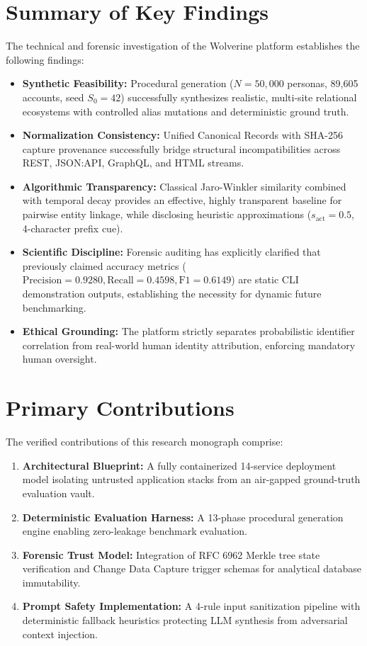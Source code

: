 \section{Summary of Key Findings}
\label{sec:concl-findings}
The technical and forensic investigation of the Wolverine platform establishes the following findings:
\begin{itemize}
    \item \textbf{Synthetic Feasibility:} Procedural generation ($N = 50{,}000$ personas, 89,605 accounts, seed $S_0 = 42$) successfully synthesizes realistic, multi-site relational ecosystems with controlled alias mutations and deterministic ground truth.
    \item \textbf{Normalization Consistency:} Unified Canonical Records with SHA-256 capture provenance successfully bridge structural incompatibilities across REST, JSON:API, GraphQL, and HTML streams.
    \item \textbf{Algorithmic Transparency:} Classical Jaro-Winkler similarity combined with temporal decay provides an effective, highly transparent baseline for pairwise entity linkage, while disclosing heuristic approximations ($s_{\text{act}} = 0.5$, 4-character prefix cue).
    \item \textbf{Scientific Discipline:} Forensic auditing has explicitly clarified that previously claimed accuracy metrics ($\text{Precision} = 0.9280, \text{Recall} = 0.4598, \text{F1} = 0.6149$) are static CLI demonstration outputs, establishing the necessity for dynamic future benchmarking.
    \item \textbf{Ethical Grounding:} The platform strictly separates probabilistic identifier correlation from real-world human identity attribution, enforcing mandatory human oversight.
\end{itemize}

\section{Primary Contributions}
\label{sec:concl-contributions}
The verified contributions of this research monograph comprise:
\begin{enumerate}
    \item \textbf{Architectural Blueprint:} A fully containerized 14-service deployment model isolating untrusted application stacks from an air-gapped ground-truth evaluation vault.
    \item \textbf{Deterministic Evaluation Harness:} A 13-phase procedural generation engine enabling zero-leakage benchmark evaluation.
    \item \textbf{Forensic Trust Model:} Integration of RFC 6962 Merkle tree state verification and Change Data Capture trigger schemas for analytical database immutability.
    \item \textbf{Prompt Safety Implementation:} A 4-rule input sanitization pipeline with deterministic fallback heuristics protecting LLM synthesis from adversarial context injection.
\end{enumerate}

